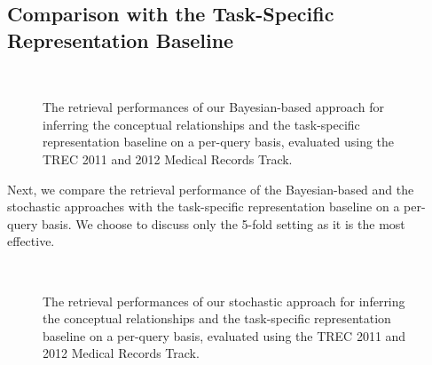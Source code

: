 \documentclass[1p]{elsarticle}
\begin{document}
\subsection{Comparison with the Task-Specific Representation Baseline}\label{c7sAnalysisTask}

\begin{figure}[tb]
\centering
        \\%
    \caption{%
        The retrieval performances of our Bayesian-based approach for inferring the conceptual relationships and the task-specific representation baseline on a per-query basis, evaluated using the TREC 2011 and 2012 Medical Records Track.
     }%
   \label{fig:ch7:bayesian}
\end{figure}

Next, we compare the retrieval performance of the Bayesian-based and the stochastic approaches with the task-specific representation baseline on a per-query basis. We choose to discuss only the 5-fold setting as it is the most effective. 



\begin{figure}[tb]
\centering
        \\%
    \caption{%
        The retrieval performances of our stochastic approach for inferring the conceptual relationships and the task-specific representation baseline on a per-query basis, evaluated using the TREC 2011 and 2012 Medical Records Track.
     }%
   \label{fig:ch7:salsa}
\end{figure}
\end{document}
